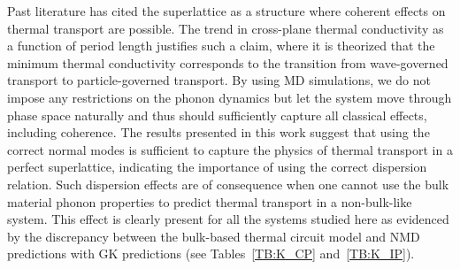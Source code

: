 \documentclass[aps,prb,preprint,preprintnumbers,amsmath,amssymb,floatfix,superscriptaddress]{revtex4}
\begin{document}

Past literature has cited the superlattice as a structure where coherent effects on thermal transport are possible. The trend in cross-plane thermal conductivity as a function of period length justifies such a claim,\cite{PhysRevB.67.195311,PhysRevB.72.174302,PhysRevB.61.3091} where it is theorized that the minimum thermal conductivity corresponds to the transition from wave-governed transport to particle-governed transport.\cite{PhysRevLett.84.927,PhysRevB.56.10754} %
By using MD simulations, we do not impose any restrictions on the phonon dynamics but let the system move through phase space naturally and thus should sufficiently capture all classical effects, including coherence. The results presented in this work suggest that using the correct normal modes is sufficient to capture the physics of thermal transport in a perfect superlattice, indicating the importance of using the correct dispersion relation. Such dispersion effects are of consequence when one cannot use the bulk material phonon properties to predict thermal transport in a non-bulk-like system. This effect is clearly present for all the systems studied here as evidenced by the discrepancy between the bulk-based thermal circuit model and NMD predictions with GK predictions (see Tables~\ref{TB:K_CP} and~\ref{TB:K_IP}).
\end{document}
